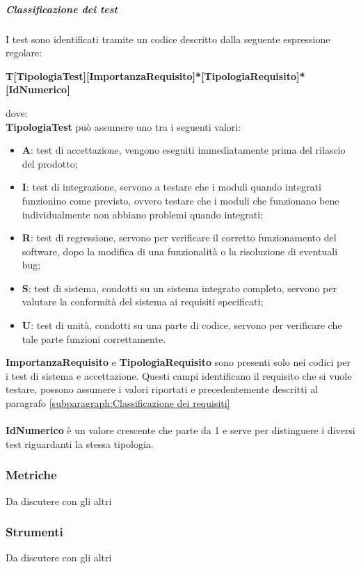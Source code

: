             \subparagraph{Classificazione dei test}
            I test sono identificati tramite un codice descritto dalla seguente espressione regolare:
            \begin{center}
                \large{\textbf{T[TipologiaTest][ImportanzaRequisito]*[TipologiaRequisito]*[IdNumerico]}}
            \end{center}
            dove:\\
            \textbf{TipologiaTest} può assumere uno tra i seguenti valori:
            \begin{itemize}
                \item \textbf{A}: test di accettazione, vengono eseguiti immediatamente prima del rilascio del prodotto;
                \item \textbf{I}: test di integrazione, servono a testare che i moduli quando integrati funzionino come previsto, ovvero testare che i moduli che funzionano bene individualmente non abbiano problemi quando integrati;
                \item \textbf{R}: test di regressione, servono per verificare il corretto funzionamento del software, dopo la modifica di una funzionalità o la risoluzione di eventuali bug\glo;
                \item \textbf{S}: test di sistema, condotti su un sistema integrato completo, servono per valutare la conformità del sistema ai requisiti specificati;
                \item \textbf{U}: test di unità, condotti su una parte di codice, servono per verificare che tale parte funzioni correttamente.
            \end{itemize}
            \textbf{ImportanzaRequisito} e \textbf{TipologiaRequisito} sono presenti solo nei codici per i test di sistema e accettazione. Questi campi identificano il requisito che si vuole testare, possono assumere i valori riportati e precedentemente descritti al paragrafo \ref{subparagraph:Classificazione dei requisiti}\\\\
            \textbf{IdNumerico} è un valore crescente che parte da 1 e serve per distinguere i diversi test riguardanti la stessa tipologia.

    \subsubsection{Metriche}
    Da discutere con gli altri

    \subsubsection{Strumenti}
    Da discutere con gli altri
    

